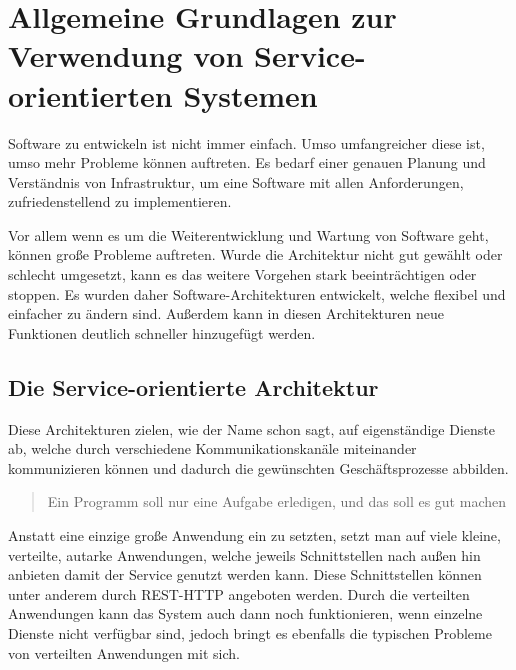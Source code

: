 \chapter[Grundlagen]{Allgemeine Grundlagen zur Verwendung von Service-orientierten Systemen}
\label{chap:grundlagen}
Software zu entwickeln ist nicht immer einfach. Umso umfangreicher diese ist, umso mehr Probleme können auftreten. Es bedarf einer genauen Planung und Verständnis von Infrastruktur, um eine Software mit allen Anforderungen, zufriedenstellend zu implementieren. 

Vor allem wenn es um die Weiterentwicklung und Wartung von Software geht, können große Probleme auftreten. Wurde die Architektur nicht gut gewählt oder schlecht umgesetzt, kann es das weitere Vorgehen stark beeinträchtigen oder stoppen. Es wurden daher Software-Architekturen entwickelt, welche flexibel und einfacher zu ändern sind. Außerdem kann in diesen Architekturen neue Funktionen deutlich schneller hinzugefügt werden.

\section{Die Service-orientierte Architektur}
\label{sec:architektur}
Diese Architekturen zielen, wie der Name schon sagt, auf eigenständige Dienste ab, welche durch verschiedene Kommunikationskanäle miteinander kommunizieren können und dadurch die gewünschten Geschäftsprozesse abbilden. 
\begin{quotation}
    \frqq Ein Programm soll nur eine Aufgabe erledigen, und das soll es gut machen\flqq \cite[S. 2]{EWolff2015:ContinuouosDelivery}
\end{quotation}
Anstatt eine einzige große Anwendung ein zu setzten, setzt man auf viele kleine, verteilte, autarke Anwendungen, welche jeweils Schnittstellen nach außen hin anbieten damit der Service genutzt werden kann. Diese Schnittstellen können unter anderem durch REST-HTTP angeboten werden.
Durch die verteilten Anwendungen kann das System auch dann noch funktionieren, wenn einzelne Dienste nicht verfügbar sind, jedoch bringt es ebenfalls die typischen Probleme von verteilten Anwendungen mit sich.

